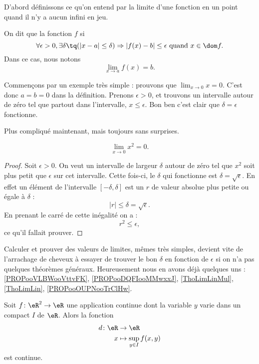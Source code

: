 D'abord définissons ce qu'on entend par la limite d'une fonction en un point quand il n'y a aucun infini en jeu.
\begin{definition}      \label{DefLimPointSansInfini}
	On dit que la fonction $f$  si
	\[
		\forall \epsilon>0,\exists\delta\tq (| x-a |\leq\delta)\Rightarrow | f(x)-b |\leq \epsilon\text{ quand }x\in\dom f.
	\]
	Dans ce cas, nous notons
	\begin{equation}
		\lim_{x\to a}f(x)=b.
	\end{equation}
\end{definition}

Commençons par un exemple très simple : prouvons que $\lim_{x\to 0}x=0$. C'est donc $a=b=0$ dans la définition. Prenons $\epsilon>0$, et trouvons un intervalle autour de zéro tel que partout dans l'intervalle, $x\leq \epsilon$. Bon ben c'est clair que $\delta=\epsilon$ fonctionne.

Plus compliqué maintenant, mais toujours sans surprises.

\begin{proposition}
	\[
		\lim_{x\to 0}x^2=0.
	\]

\end{proposition}

\begin{proof}
	Soit $\epsilon>0$. On veut un intervalle de largeur $\delta$ autour de zéro tel que $x^2$ soit plus petit que $\epsilon$ sur cet intervalle. Cette fois-ci, le $\delta$ qui fonctionne est $\delta=\sqrt{\epsilon}$. En effet un élément de l'intervalle $[-\delta,\delta]$ est un $r$ de valeur absolue plus petite ou égale à $\delta$ :
	\[
		| r |\leq\delta=\sqrt{\epsilon}.
	\]
	En prenant le carré de cette inégalité on a :
	\[
		r^2\leq\epsilon,
	\]
	ce qu'il fallait prouver.
\end{proof}

Calculer et prouver des valeurs de limites, mêmes très simples, devient vite de l'arrachage de cheveux à essayer de trouver le bon $\delta$ en fonction de $\epsilon$ si on n'a pas quelques théorèmes généraux. Heureusement nous en avons déjà quelques uns : \ref{PROPooVLBWooVttvFK}, \ref{PROPooDQFIooMMwxxJ}, \ref{ThoLimLinMul}, \ref{ThoLimLin}, \ref{PROPooOUPNooTrClHw}.

\begin{proposition}      \label{PROPooWXBAooAEweSF}
	Soit \( f\colon \eR^2\to \eR\) une application continue dont la variable \( y\) varie dans un compact \( I\) de \( \eR\). Alors la fonction
	\begin{equation}
		\begin{aligned}
			d\colon \eR & \to \eR                      \\
			x           & \mapsto \sup_{y\in I} f(x,y)
		\end{aligned}
	\end{equation}
	est continue.
\end{proposition}


